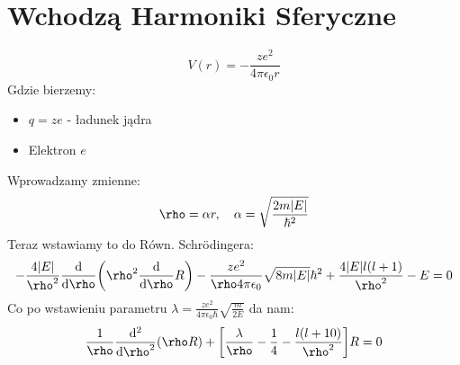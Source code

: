 \documentclass[12pt,a4paper]{report}
\newenvironment{lecture}[1]{\par\medskip
   \noindent\chapter{#1} \rmfamily}{\medskip}
\begin{document}
\begin{lecture}{Wchodzą Harmoniki Sferyczne}
\begin{enumerate}
    \[
        V(r) = - \frac{z e^2}{4 \pi \epsilon_0 r}
    \]
    Gdzie bierzemy:
    \begin{itemize}
        \item $q = z e$ - ładunek jądra
        \item Elektron $e$
    \end{itemize}
    Wprowadzamy zmienne:
    \[
        \rho = \alpha r \qc \alpha = \sqrt{\frac{2 m \abs{E}}{\hbar^2}}
    \]
    Teraz wstawiamy to do Równ. Schrödingera:
    \[
        -\frac{4 \abs{E}}{\rho^2} \dv{\rho} \qty(\rho^2 \dv{\rho}R) - \frac{ze^2}{\rho 4 \pi \epsilon_0} \sqrt{8 m \abs{E}}\hbar^2 + \frac{4\abs{E} l (l+1)}{\rho^2} - E = 0
    \]
    Co po wstawieniu parametru $\lambda = \frac{z e^2}{4 \pi \epsilon_0 \hbar} \sqrt{\frac{m}{2E}}$ da nam:
    \[
        \frac{1}{\rho} \dv[2]{\rho}(\rho R) + \qty[\frac{\lambda}{\rho} - \frac14 - \frac{l(l+10)}{\rho^2}]R = 0
    \]
\end{enumerate}

\end{lecture}

\end{document}
